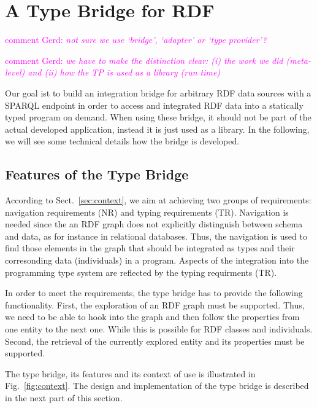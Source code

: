 \documentclass{llncs} %
\newcommand{\ggr}[1]{\textcolor{magenta}{comment Gerd: \textit{#1}}}
\begin{document}
\section{A Type Bridge for RDF}  
\label{sec:design}

\ggr{not sure we use `bridge', `adapter' or `type provider'?}

\ggr{we have to make the distinction clear: (i) the work we did (meta-level) and (ii) how the TP is used as a library (run time)}

Our goal ist to build an integration bridge for arbitrary RDF data sources with a SPARQL endpoint
in order to access and integrated RDF data into a statically typed program on demand.
When using these bridge, it should not be part of the actual developed application,
instead it is just used as a library. In the following, we will see some technical details how
the bridge is developed.

\subsection{Features of the Type Bridge}
  
According to Sect.~\ref{sec:context}, we aim at achieving two groups of requirements:
navigation requirements (NR) and typing requirements (TR). Navigation is needed since the an RDF graph does not explicitly 
distinguish between schema and data, as for instance in relational databases. Thus, the navigation is
used to find those elements in the graph that should be integrated as types and their corresonding data (individuals) in a program.
Aspects of the integration into the programming type system are reflected by the typing requirments (TR).

In order to meet the requirements, the type bridge has to provide the following functionality.
First, the exploration of an RDF graph must be supported. Thus, we need to be able to hook into the graph and then
follow the properties from one entity to the next one. While this is possible for RDF classes and individuals.
Second, the retrieval of the currently explored entity and its properties must be supported.

The type bridge, its features and its context of use is illustrated in Fig.~\ref{fig:context}.
The design and implementation of the type bridge is described in the next part of this section.
\end{document}
